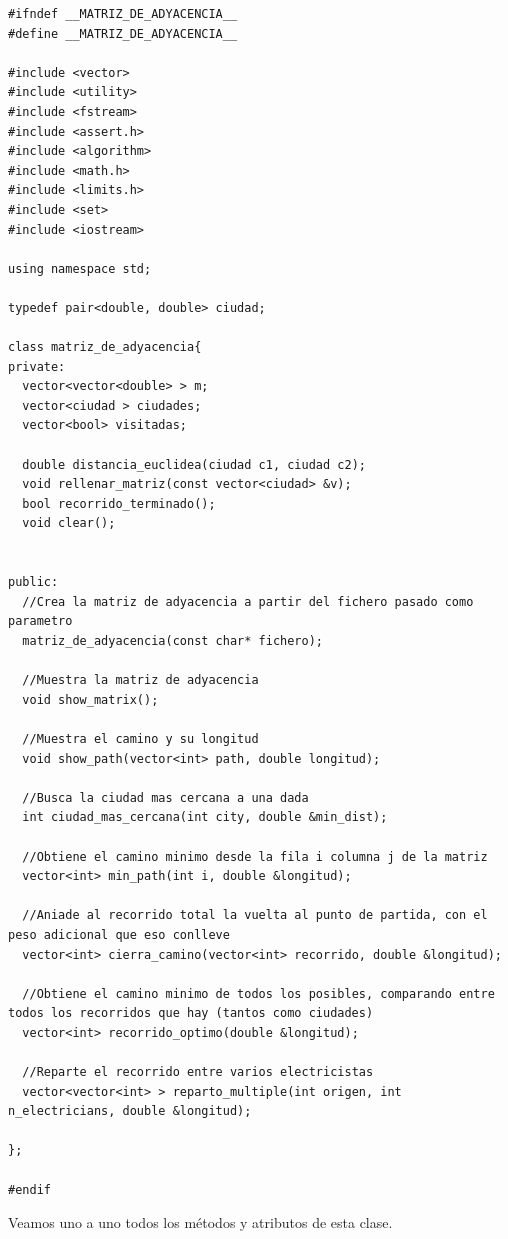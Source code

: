 \documentclass[12pt]{article}
\begin{document}
\begin{lstlisting}
#ifndef __MATRIZ_DE_ADYACENCIA__
#define __MATRIZ_DE_ADYACENCIA__

#include <vector>
#include <utility>
#include <fstream>
#include <assert.h>
#include <algorithm>
#include <math.h>
#include <limits.h>
#include <set>
#include <iostream>

using namespace std;

typedef pair<double, double> ciudad;

class matriz_de_adyacencia{
private:
  vector<vector<double> > m;
  vector<ciudad > ciudades;
  vector<bool> visitadas;

  double distancia_euclidea(ciudad c1, ciudad c2);
  void rellenar_matriz(const vector<ciudad> &v);
  bool recorrido_terminado();
  void clear();


public:
  //Crea la matriz de adyacencia a partir del fichero pasado como parametro
  matriz_de_adyacencia(const char* fichero);

  //Muestra la matriz de adyacencia
  void show_matrix();

  //Muestra el camino y su longitud
  void show_path(vector<int> path, double longitud);

  //Busca la ciudad mas cercana a una dada
  int ciudad_mas_cercana(int city, double &min_dist);

  //Obtiene el camino minimo desde la fila i columna j de la matriz
  vector<int> min_path(int i, double &longitud);

  //Aniade al recorrido total la vuelta al punto de partida, con el peso adicional que eso conlleve
  vector<int> cierra_camino(vector<int> recorrido, double &longitud);

  //Obtiene el camino minimo de todos los posibles, comparando entre todos los recorridos que hay (tantos como ciudades)
  vector<int> recorrido_optimo(double &longitud);

  //Reparte el recorrido entre varios electricistas
  vector<vector<int> > reparto_multiple(int origen, int n_electricians, double &longitud);

};

#endif

\end{lstlisting} 
Veamos uno a uno todos los métodos y atributos de esta clase.
\end{document}
